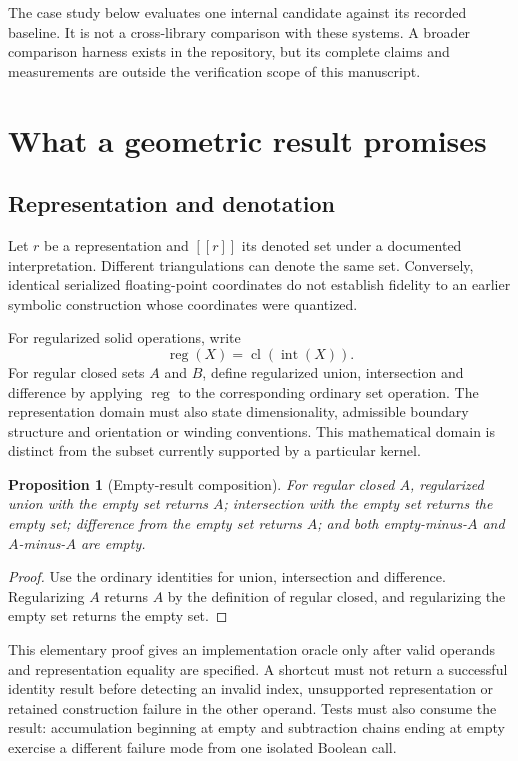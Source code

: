 \documentclass[11pt]{article}
\newtheorem{proposition}{Proposition}
\newcommand{\reg}{\operatorname{reg}}
\newcommand{\cl}{\operatorname{cl}}
\newcommand{\intr}{\operatorname{int}}
\newcommand{\den}[1]{[\![#1]\!]}
\begin{document}
The case study below evaluates one internal candidate against its recorded
baseline. It is not a cross-library comparison with these systems. A broader
comparison harness exists in the repository, but its complete claims and
measurements are outside the verification scope of this manuscript.

\section{What a geometric result promises}
\subsection{Representation and denotation}
Let $r$ be a representation and $\den{r}$ its denoted set under a documented
interpretation. Different triangulations can denote the same set. Conversely,
identical serialized floating-point coordinates do not establish fidelity to
an earlier symbolic construction whose coordinates were quantized.

For regularized solid operations, write
\[
  \reg(X)=\cl(\intr(X)).
\]
For regular closed sets $A$ and $B$, define regularized union, intersection and
difference by applying $\reg$ to the corresponding ordinary set operation.
The representation domain must also state dimensionality, admissible boundary
structure and orientation or winding conventions. This mathematical domain
is distinct from the subset currently supported by a particular kernel.

\begin{proposition}[Empty-result composition]
For regular closed $A$, regularized union with the empty set returns $A$;
intersection with the empty set returns the empty set; difference from the
empty set returns $A$; and both empty-minus-$A$ and $A$-minus-$A$ are empty.
\end{proposition}
\begin{proof}
Use the ordinary identities for union, intersection and difference. Regularizing
$A$ returns $A$ by the definition of regular closed, and regularizing the empty
set returns the empty set.
\end{proof}

This elementary proof gives an implementation oracle only after valid operands
and representation equality are specified. A shortcut must not return a
successful identity result before detecting an invalid index, unsupported
representation or retained construction failure in the other operand. Tests
must also consume the result: accumulation beginning at empty and subtraction
chains ending at empty exercise a different failure mode from one isolated
Boolean call.
\end{document}
